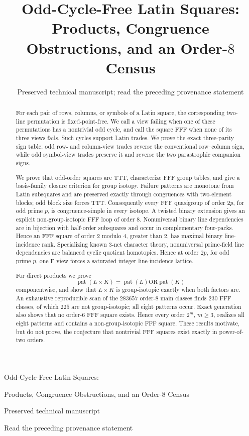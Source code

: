\documentclass[11pt]{article}
\title{Odd-Cycle-Free Latin Squares:\\
  Products, Congruence Obstructions, and an Order-$8$ Census}
\author{}
\date{\small Preserved technical manuscript; read the preceding provenance statement}
\theoremstyle{definition}
\theoremstyle{remark}
\newcommand{\pat}{\operatorname{pat}}
\begin{document}



\begin{center}
{\LARGE Odd-Cycle-Free Latin Squares:\par}
\vspace{0.35em}
{\LARGE Products, Congruence Obstructions, and an Order-$8$ Census\par}
\vspace{1.25em}
{\small Preserved technical manuscript\par}
\vspace{0.7em}

{\small Read the preceding provenance statement\par}
\end{center}
\vspace{0.75em}

\begin{abstract}
For each pair of rows, columns, or symbols of a Latin square, the corresponding
two-line permutation is fixed-point-free.  We call a view failing when one of
these permutations has a nontrivial odd cycle, and call the square FFF when
none of its three views fails.  Such cycles support Latin trades.  We prove
the exact three-parity sign table: odd row- and column-view trades reverse the
conventional row--column sign, while odd symbol-view trades preserve it and
reverse the two parastrophic companion signs.

We prove that odd-order squares are TTT, characterize FFF group tables, and
give a basis-family closure criterion for group isotopy.  Failure patterns are
monotone from Latin subsquares and are preserved exactly through congruences
with two-element blocks; odd block size forces TTT.  Consequently every FFF
quasigroup of order $2p$, for odd prime $p$, is congruence-simple in every
isotope.  A twisted binary extension gives an explicit non-group-isotopic FFF
loop of order $8$.  Nonuniversal binary line dependencies are in bijection
with half-order subsquares and occur in complementary four-packs.  Hence an
FFF square of order $2$ modulo $4$, greater than $2$, has maximal binary
line-incidence rank.  Specializing known $3$-net character theory,
nonuniversal prime-field line dependencies are balanced cyclic quotient
homotopies.  Hence at order $2p$, for odd prime $p$, one F view forces a
saturated integer line-incidence lattice.

For direct products we prove
\[
  \pat(L\times K)=\pat(L)\mathbin{\mathrm{OR}}\pat(K)
\]
componentwise, and show that $L\times K$ is group-isotopic exactly when both
factors are.  An exhaustive reproducible scan of the $283657$ order-$8$ main
classes finds $230$ FFF classes, of which $225$ are not group-isotopic; all
eight patterns occur.  Exact generation also shows that no order-$6$ FFF
square exists.  Hence every order $2^m$, $m\geq3$, realizes all eight patterns
and contains a non-group-isotopic FFF square.  These results motivate, but do
not prove, the conjecture that nontrivial FFF squares exist exactly in
power-of-two orders.
\end{abstract}
\end{document}
